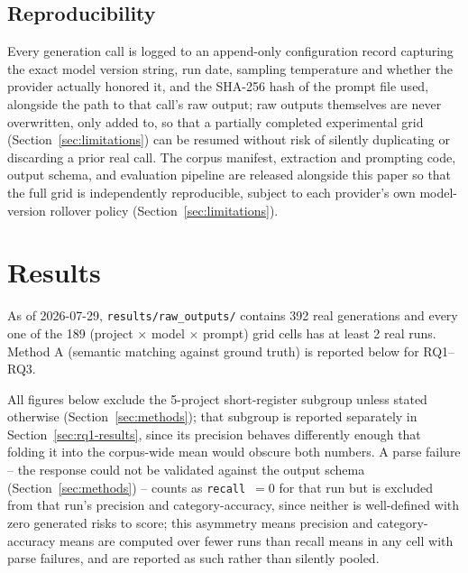 \documentclass[conference]{IEEEtran}
\begin{document}
\subsection{Reproducibility}
Every generation call is logged to an append-only configuration record
capturing the exact model version string, run date, sampling temperature
and whether the provider actually honored it, and the SHA-256 hash of the
prompt file used, alongside the path to that call's raw output; raw outputs
themselves are never overwritten, only added to, so that a partially
completed experimental grid (Section~\ref{sec:limitations}) can be resumed
without risk of silently duplicating or discarding a prior real call. The
corpus manifest, extraction and prompting code, output schema, and
evaluation pipeline are released alongside this paper so that the full grid
is independently reproducible, subject to each provider's own model-version
rollover policy (Section~\ref{sec:limitations}).

\section{Results}
\label{sec:results}

As of 2026-07-29, \texttt{results/raw\_outputs/} contains 392 real
generations and every one of the 189 (project $\times$ model $\times$
prompt) grid cells has at least 2 real runs. Method A (semantic matching
against ground truth) is reported below for RQ1--RQ3.

All figures below exclude the 5-project short-register subgroup unless
stated otherwise (Section~\ref{sec:methods}); that subgroup is reported
separately in Section~\ref{sec:rq1-results}, since its precision behaves
differently enough that folding it into the corpus-wide mean would obscure
both numbers. A parse failure -- the response could not be validated
against the output schema (Section~\ref{sec:methods}) -- counts as
\texttt{recall}~$=0$ for that run but is excluded from that run's precision
and category-accuracy, since neither is well-defined with zero generated
risks to score; this asymmetry means precision and category-accuracy means
are computed over fewer runs than recall means in any cell with parse
failures, and are reported as such rather than silently pooled.
\end{document}
